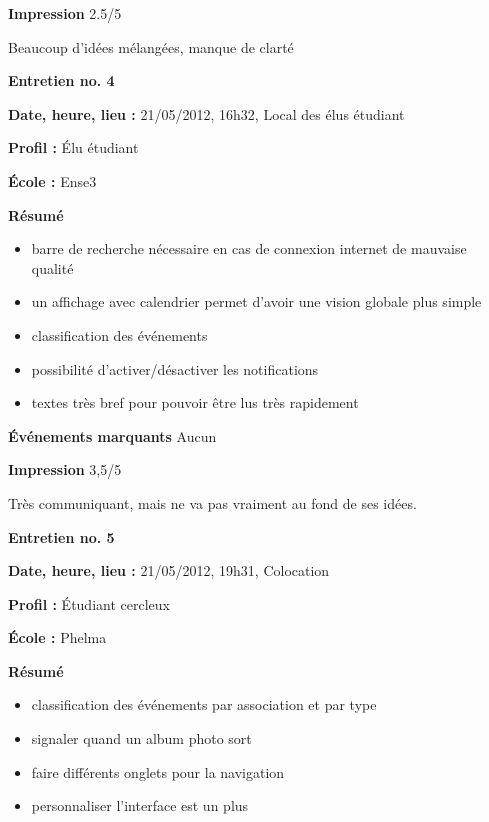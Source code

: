 \documentclass[a4paper, 11px]{article}
\begin{document}
\vspace{.25cm}
\textbf{Impression} 2.5/5 

Beaucoup d'idées mélangées, manque de clarté



\vspace{.3cm}

 \textbf {\large Entretien no. 4}

\textbf{Date, heure, lieu : }
21/05/2012, 16h32, Local des élus étudiant

\textbf{Profil : }
Élu étudiant

\textbf{École : }
Ense3

\textbf{Résumé}
	\begin{itemize}
		\item barre de recherche nécessaire en cas de connexion internet de mauvaise qualité
		\item un affichage avec calendrier permet d'avoir une vision globale plus simple
		\item classification des événements
		\item possibilité d'activer/désactiver les notifications
		\item textes très bref pour pouvoir être lus très rapidement
	\end{itemize}
\vspace{.25cm}

\textbf{Événements marquants}
Aucun


\textbf{Impression} 3,5/5

Très communiquant, mais ne va pas vraiment au fond de ses idées.



\vspace{.3cm}

 \textbf {\large Entretien no. 5}

\textbf{Date, heure, lieu : }
21/05/2012, 19h31, Colocation

\textbf{Profil : }
Étudiant cercleux


\textbf{École : }
Phelma

\textbf{Résumé}
	\begin{itemize}
		\item classification des événements par association et par type
		\item signaler quand un album photo sort
		\item faire différents onglets pour la navigation
		\item personnaliser l'interface est un plus
	\end{itemize}
\vspace{.25cm}
\end{document}
